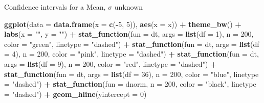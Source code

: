 \documentclass[
  ignorenonframetext,
]{beamer}
\newenvironment{Shaded}{\begin{snugshade}}{\end{snugshade}}
\newcommand{\AttributeTok}[1]{\textcolor[rgb]{0.13,0.29,0.53}{#1}}
\newcommand{\DecValTok}[1]{\textcolor[rgb]{0.00,0.00,0.81}{#1}}
\newcommand{\FunctionTok}[1]{\textcolor[rgb]{0.13,0.29,0.53}{\textbf{#1}}}
\newcommand{\NormalTok}[1]{#1}
\newcommand{\SpecialCharTok}[1]{\textcolor[rgb]{0.81,0.36,0.00}{\textbf{#1}}}
\newcommand{\StringTok}[1]{\textcolor[rgb]{0.31,0.60,0.02}{#1}}
\begin{document}
\begin{frame}[fragile]{Confidence intervals for a Mean, \(\sigma\)
unknown}
\begin{Shaded}
\begin{Highlighting}[]
\FunctionTok{ggplot}\NormalTok{(}\AttributeTok{data =} \FunctionTok{data.frame}\NormalTok{(}\AttributeTok{x =} \FunctionTok{c}\NormalTok{(}\SpecialCharTok{{-}}\DecValTok{5}\NormalTok{, }\DecValTok{5}\NormalTok{)), }\FunctionTok{aes}\NormalTok{(}\AttributeTok{x =}\NormalTok{ x)) }\SpecialCharTok{+} 
  \FunctionTok{theme\_bw}\NormalTok{() }\SpecialCharTok{+}
  \FunctionTok{labs}\NormalTok{(}\AttributeTok{x =} \StringTok{""}\NormalTok{, }\AttributeTok{y =} \StringTok{""}\NormalTok{) }\SpecialCharTok{+}
  \FunctionTok{stat\_function}\NormalTok{(}\AttributeTok{fun =}\NormalTok{ dt, }\AttributeTok{args =} \FunctionTok{list}\NormalTok{(}\AttributeTok{df =} \DecValTok{1}\NormalTok{), }\AttributeTok{n =} \DecValTok{200}\NormalTok{, }\AttributeTok{color =} \StringTok{"green"}\NormalTok{, }\AttributeTok{linetype =} \StringTok{"dashed"}\NormalTok{) }\SpecialCharTok{+} 
  \FunctionTok{stat\_function}\NormalTok{(}\AttributeTok{fun =}\NormalTok{ dt, }\AttributeTok{args =} \FunctionTok{list}\NormalTok{(}\AttributeTok{df =} \DecValTok{4}\NormalTok{), }\AttributeTok{n =} \DecValTok{200}\NormalTok{, }\AttributeTok{color =} \StringTok{"pink"}\NormalTok{, }\AttributeTok{linetype =} \StringTok{"dashed"}\NormalTok{) }\SpecialCharTok{+} 
  \FunctionTok{stat\_function}\NormalTok{(}\AttributeTok{fun =}\NormalTok{ dt, }\AttributeTok{args =} \FunctionTok{list}\NormalTok{(}\AttributeTok{df =} \DecValTok{9}\NormalTok{), }\AttributeTok{n =} \DecValTok{200}\NormalTok{, }\AttributeTok{color =} \StringTok{"red"}\NormalTok{, }\AttributeTok{linetype =} \StringTok{"dashed"}\NormalTok{) }\SpecialCharTok{+} 
  \FunctionTok{stat\_function}\NormalTok{(}\AttributeTok{fun =}\NormalTok{ dt, }\AttributeTok{args =} \FunctionTok{list}\NormalTok{(}\AttributeTok{df =} \DecValTok{36}\NormalTok{), }\AttributeTok{n =} \DecValTok{200}\NormalTok{, }\AttributeTok{color =} \StringTok{"blue"}\NormalTok{, }\AttributeTok{linetype =} \StringTok{"dashed"}\NormalTok{) }\SpecialCharTok{+} 
  \FunctionTok{stat\_function}\NormalTok{(}\AttributeTok{fun =}\NormalTok{ dnorm, }\AttributeTok{n =} \DecValTok{200}\NormalTok{, }\AttributeTok{color =} \StringTok{"black"}\NormalTok{, }\AttributeTok{linetype =} \StringTok{"dashed"}\NormalTok{) }\SpecialCharTok{+}
  \FunctionTok{geom\_hline}\NormalTok{(}\AttributeTok{yintercept =} \DecValTok{0}\NormalTok{)}
\end{Highlighting}
\end{Shaded}


\end{frame}
\end{document}
